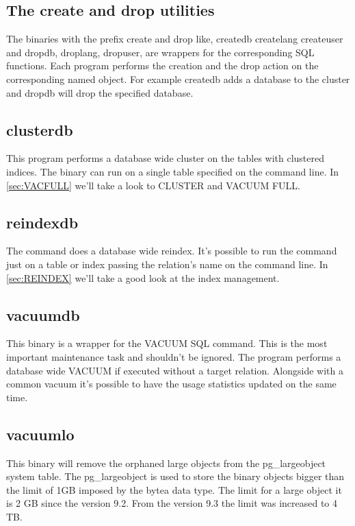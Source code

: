 \subsection{The create and drop utilities}
The binaries with the prefix create and drop like, createdb createlang createuser and dropdb,
droplang, dropuser, are wrappers for the corresponding SQL functions. Each program performs the
creation and the drop action on the corresponding named object. For example createdb adds a
database to the cluster and dropdb will drop the specified database.

\subsection{clusterdb}
This program performs a database wide cluster on the tables with clustered indices.
The binary can run on a single table specified on the command line. In \ref{sec:VACFULL} we'll
take a look to CLUSTER and VACUUM FULL.

\subsection{reindexdb}
The command does a database wide reindex. It's possible to run the command just on a table or index
passing the relation's name on the command line. In \ref{sec:REINDEX} we'll take a good look at
the index management.

\subsection{vacuumdb}
This binary is a wrapper for the VACUUM  SQL command. This is the most important
maintenance task and shouldn't be ignored. The program performs a database wide VACUUM if executed
without a target relation. Alongside with a common vacuum it's possible to have the usage
statistics updated on the same time.

\subsection{vacuumlo}
This binary will remove the orphaned large objects from the pg\_largeobject system table. The
pg\_largeobject is used to store the binary objects bigger than the limit of 1GB imposed by the
bytea data type. The limit for a large object it is 2 GB since the version 9.2. From the version
9.3 the limit was increased to 4 TB.

